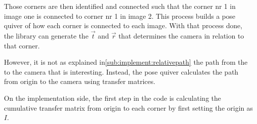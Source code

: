 Those corners are then identified and connected such that the corner nr 1 in image one is connected to corner nr 1 in image 2.
This process builds a pose quiver of how each corner is connected to each image.
With that process done, the \aruco{ } library can generate the $\vec{t}$ and $\vec{r}$ that determines the camera in relation to that corner.

However, it is not as explained in\ref{sub:implement:relativepath} the path from the \aruco to the camera that is interesting.
Instead, the pose quiver calculates the path from origin to the camera using transfer matrices.

On the implementation side, the first step in the code is calculating the cumulative transfer matrix from origin to each corner by first setting the origin as $I$.




